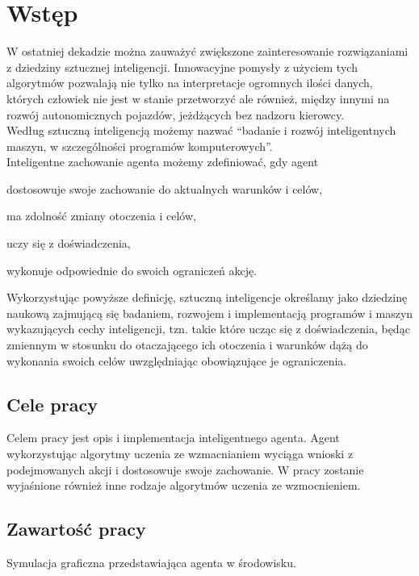 \chapter{Wstęp}
\label{cha:wstep}

W ostatniej dekadzie można zauważyć zwiększone zainteresowanie rozwiązaniami z dziedziny
sztucznej inteligencji. Innowacyjne pomysły z użyciem tych algorytmów pozwalają nie tylko na interpretacje ogromnych 
ilości danych, których człowiek nie jest w stanie przetworzyć ale również, między innymi na rozwój 
autonomicznych pojazdów, jeżdżących bez nadzoru kierowcy.\\
Według \cite{mccarthy2007artificial} sztuczną inteligencją możemy nazwać ``badanie i rozwój inteligentnych maszyn, 
w szczególności programów komputerowych''.\\
Inteligentne zachowanie agenta możemy zdefiniować, gdy agent\cite{L.:2010:AIF:1809744}
\begin{itemize*}
 \item dostosowuje swoje zachowanie do aktualnych warunków i celów,
 \item ma zdolność zmiany otoczenia i celów,
 \item uczy się z doświadczenia,
 \item wykonuje odpowiednie do swoich ograniczeń akcję.
\end{itemize*}
Wykorzystując powyższe definicję, sztuczną inteligencje określamy jako dziedzinę naukową zajmującą się badaniem, 
rozwojem i implementacją programów i maszyn wykazujących cechy inteligencji, tzn. takie które ucząc się z 
doświadczenia, będąc zmiennym w stosunku do otaczającego ich otoczenia i warunków dążą do wykonania swoich celów 
uwzględniając obowiązujące je ograniczenia. 

\section{Cele pracy}
\label{sec:celePracy}

Celem pracy jest opis i implementacja inteligentnego agenta. Agent wykorzystując algorytmy uczenia ze wzmacnianiem 
wyciąga wnioski z podejmowanych akcji i dostosowuje swoje zachowanie. W pracy zostanie wyjaśnione również inne rodzaje 
algorytmów uczenia ze wzmocnieniem.



\section{Zawartość pracy}
\label{sec:zawartoscPracy}

Symulacja graficzna przedstawiająca agenta w środowisku.















